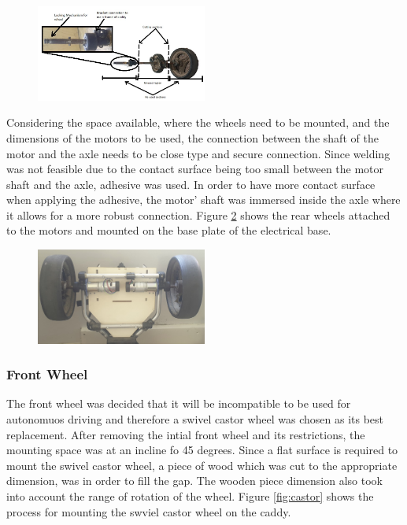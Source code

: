 \documentclass[11pt,landscape]{article}
\begin{document}
\begin{multicols}{2}
    \begin{figure}[H]
        \begin{center}
            \includegraphics[width=0.5\textwidth]{Figure26.jpg}
            \label{fig:rear}
        \end{center}
    \end{figure}
    
    Considering the space available, where the wheels need to be mounted, and
    the dimensions of the motors to be used, the connection between the shaft of
    the motor and the axle needs to be close type and secure connection. Since
    welding was not feasible due to the contact surface being too small between
    the motor shaft and the axle, adhesive was used. In order to have more
    contact surface when applying the adhesive, the motor’ shaft was immersed
    inside the axle where it allows for a more robust connection. Figure
    \ref{fig:auto} shows the rear wheels attached to the motors and mounted on
    the base plate of the electrical base.
    
    \begin{figure}[H]
        \begin{center}
            \includegraphics[width=0.5\textwidth]{Figure27.jpg}
            \label{fig:auto}
        \end{center}
    \end{figure}
    
    
    \subsubsection{Front Wheel}
    The front wheel was decided that it will be incompatible to be used for
    autonomuos driving and therefore a swivel castor wheel was chosen as its
    best replacement. After removing the intial front wheel and its
    restrictions, the mounting space was at an incline fo 45 degrees. Since a
    flat surface is required to mount the swivel castor wheel, a piece of wood
    which was cut to the appropriate dimension, was in order to fill the gap.
    The wooden piece dimension also took into account the range of rotation of
    the wheel. Figure \ref{fig:castor} shows the process for mounting the swviel
    castor wheel on the caddy. 
    

\end{multicols}
\end{document}
